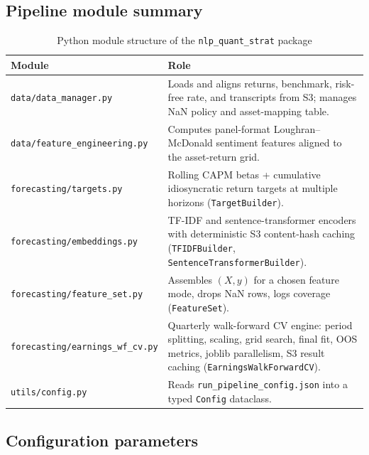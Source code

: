 \documentclass{article}
\begin{document}
\subsection{Pipeline module summary}

\begin{table}[H]
\centering
\caption{Python module structure of the \texttt{nlp\_quant\_strat} package}
\label{tab:pipeline}
\begin{tabular}{lp{9.0cm}}
\toprule
\textbf{Module} & \textbf{Role} \\
\midrule
\texttt{data/data\_manager.py}         & Loads and aligns returns, benchmark, risk-free rate, and transcripts from S3; manages NaN policy and asset-mapping table. \\[0.3em]
\texttt{data/feature\_engineering.py}  & Computes panel-format Loughran--McDonald sentiment features aligned to the asset-return grid. \\[0.3em]
\texttt{forecasting/targets.py}        & Rolling CAPM betas + cumulative idiosyncratic return targets at multiple horizons (\texttt{TargetBuilder}). \\[0.3em]
\texttt{forecasting/embeddings.py}     & TF-IDF and sentence-transformer encoders with deterministic S3 content-hash caching (\texttt{TFIDFBuilder}, \texttt{SentenceTransformerBuilder}). \\[0.3em]
\texttt{forecasting/feature\_set.py}   & Assembles $(X, y)$ for a chosen feature mode, drops NaN rows, logs coverage (\texttt{FeatureSet}). \\[0.3em]
\texttt{forecasting/earnings\_wf\_cv.py} & Quarterly walk-forward CV engine: period splitting, scaling, grid search, final fit, OOS metrics, joblib parallelism, S3 result caching (\texttt{EarningsWalkForwardCV}). \\[0.3em]
\texttt{utils/config.py}               & Reads \texttt{run\_pipeline\_config.json} into a typed \texttt{Config} dataclass. \\
\bottomrule
\end{tabular}
\end{table}

\subsection{Configuration parameters}
\end{document}
